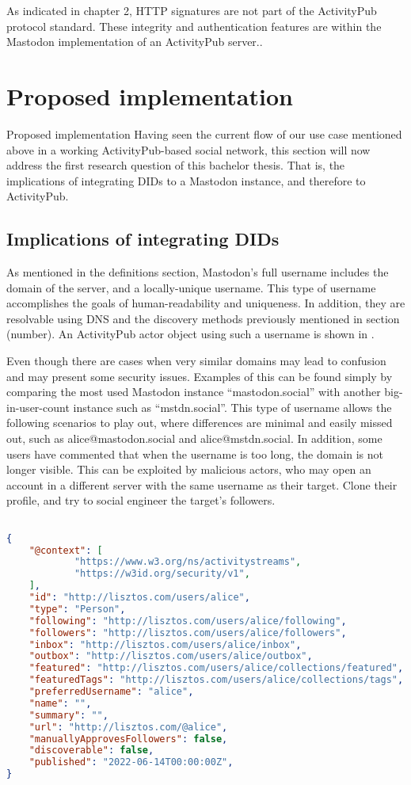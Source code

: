 As indicated in chapter 2, HTTP signatures are not part of the ActivityPub protocol standard. These integrity and authentication features are within the Mastodon implementation of an ActivityPub server.. 


\section{Proposed implementation}
Proposed implementation
Having seen the current flow of our use case mentioned above in a working ActivityPub-based social network, this section will now address the first research question of this bachelor thesis. That is, the implications of integrating DIDs to a Mastodon instance, and therefore to ActivityPub. 

\subsection*{Implications of integrating DIDs}
As mentioned in the definitions section, Mastodon’s full username includes the domain of the server, and a locally-unique username. This type of username accomplishes the goals of human-readability and uniqueness. In addition, they are resolvable using DNS and the discovery methods previously mentioned in section (number). An ActivityPub actor object using such a username is shown in \label{actor object}.  


Even though there are cases when very similar domains may lead to confusion and may present some security issues. Examples of this can be found simply by comparing the most used Mastodon instance “mastodon.social” with another big-in-user-count instance such as “mstdn.social”. This type of username allows the following scenarios to play out, where differences are minimal and easily missed out, such as alice@mastodon.social and alice@mstdn.social. In addition, some users have commented that when the username is too long, the domain is not longer visible. This can be exploited by malicious actors, who may open an account in a different server with the same username as their target. Clone their profile, and try to social engineer the target’s followers. 

\begin{lstlisting}[language=json, caption=Alice's actor objec, label=actor object]

{
	"@context": [
			"https://www.w3.org/ns/activitystreams",
			"https://w3id.org/security/v1",
	],
	"id": "http://lisztos.com/users/alice",
	"type": "Person",
	"following": "http://lisztos.com/users/alice/following",
	"followers": "http://lisztos.com/users/alice/followers",
	"inbox": "http://lisztos.com/users/alice/inbox",
	"outbox": "http://lisztos.com/users/alice/outbox",
	"featured": "http://lisztos.com/users/alice/collections/featured",
	"featuredTags": "http://lisztos.com/users/alice/collections/tags",
	"preferredUsername": "alice",
	"name": "",
	"summary": "",
	"url": "http://lisztos.com/@alice",
	"manuallyApprovesFollowers": false,
	"discoverable": false,
	"published": "2022-06-14T00:00:00Z",
}

\end{lstlisting}

